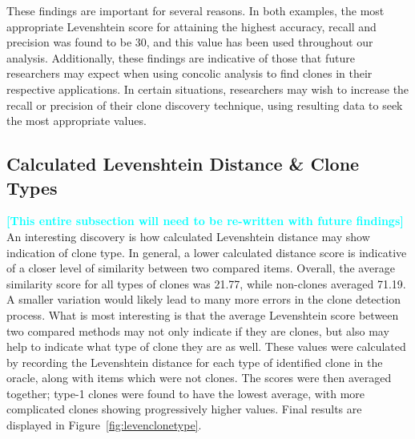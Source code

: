\documentclass[smallextended]{svjour3}       %
\newcommand{\todo}[1]{\textcolor{cyan}{\textbf{[#1]}}}
\begin{document}
These findings are important for several reasons. In both examples, the most appropriate Levenshtein score for attaining the highest accuracy, recall and precision was found to be 30, and this value has been used throughout our analysis. Additionally, these findings are indicative of those that future researchers may expect when using concolic analysis to find clones in their respective applications. In certain situations, researchers may wish to increase the recall or precision of their clone discovery technique, using resulting data to seek the most appropriate values.


\subsection{Calculated Levenshtein Distance \& Clone Types}
\todo{This entire subsection will need to be re-written with future findings}
An interesting discovery is how calculated Levenshtein distance may show indication of clone type. In general, a lower calculated distance score is indicative of a closer level of similarity between two compared items. Overall, the average similarity score for all types of clones was 21.77, while non-clones averaged 71.19. A smaller variation would likely lead to many more errors in the clone detection process. What is most interesting is that the average Levenshtein score between two compared methods may not only indicate if they are clones, but also may help to indicate what type of clone they are as well. These values were calculated by recording the Levenshtein distance for each type of identified clone in the oracle, along with items which were not clones. The scores were then averaged together; type-1 clones were found to have the lowest average, with more complicated clones showing progressively higher values. Final results are displayed in Figure~\ref{fig:levenclonetype}.
\end{document}
